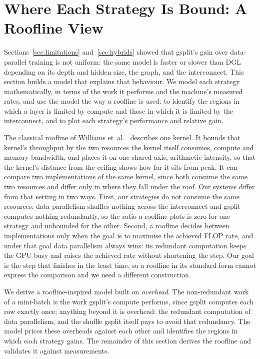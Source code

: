 \section{Where Each Strategy Is Bound: A Roofline View}
\label{sec:roofline}
\label{sec:simulator}   %
\label{sec:floorline}

Sections~\ref{sec:limitations} and~\ref{sec:hybrids} showed that gsplit's gain over data-parallel
training is not uniform: the same model is faster or slower than DGL depending on its depth and
hidden size, the graph, and the interconnect. This section builds a model that explains that
behaviour. We model each strategy mathematically, in terms of the work it performs and the
machine's measured rates, and use the model the way a roofline is used: to identify the regions in
which a layer is limited by compute and those in which it is limited by the interconnect, and to
plot each strategy's performance and relative gain.

The classical roofline of Williams et~al.~\cite{williams2009roofline} describes one kernel. It
bounds that kernel's throughput by the two resources the kernel itself consumes, compute and memory
bandwidth, and places it on one shared axis, arithmetic intensity, so that the kernel's distance
from the ceiling shows how far it sits from peak. It can compare two implementations of the same
kernel, since both consume the same two resources and differ only in where they fall under the
roof. Our systems differ from that setting in two ways. First, our strategies do not consume the
same resources: data parallelism shuffles nothing across the interconnect and gsplit computes
nothing redundantly, so the ratio a roofline plots is zero for one strategy and unbounded for the
other. Second, a roofline decides between implementations only when the goal is to maximise the
achieved FLOP rate, and under that goal data parallelism always wins: its redundant computation
keeps the GPU busy and raises the achieved rate without shortening the step. Our goal is the step
that finishes in the least time, so a roofline in its standard form cannot express the comparison
and we need a different construction.

We derive a roofline-inspired model built on \emph{overhead}. The non-redundant work of a
mini-batch is the work gsplit's compute performs, since gsplit computes each row exactly once;
anything beyond it is overhead: the redundant computation of data parallelism, and the shuffle
gsplit itself pays to avoid that redundancy. The model prices these overheads against each other
and identifies the regions in which each strategy gains. The remainder of this section derives the
roofline and validates it against measurements.

